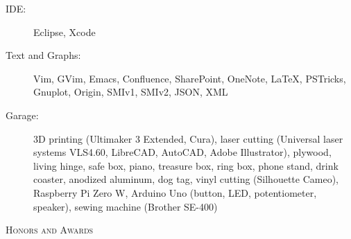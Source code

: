 \documentclass[letterpaper,11pt]{article}
\newcommand{\resheading}[1]{{\noindent\large \colorbox{mygrey}{
\begin{minipage}{1.0\textwidth}{\textsc{#1 \vphantom{p\^{E}}}}\end{minipage}}}}
\begin{document}
\begin{description}
\item[IDE:] Eclipse, Xcode

\item[Text and Graphs:] Vim, GVim, Emacs, Confluence, SharePoint, OneNote, \LaTeX, PSTricks, Gnuplot, Origin, SMIv1, SMIv2, JSON, XML

\item[Garage:] 3D printing (Ultimaker 3 Extended, Cura), laser cutting (Universal laser systems VLS4.60, LibreCAD, AutoCAD, Adobe Illustrator),
plywood, living hinge, safe box, piano, treasure box, ring box, phone stand, drink coaster, anodized aluminum, dog tag,
vinyl cutting (Silhouette Cameo), Raspberry Pi Zero W, Arduino Uno (button, LED, potentiometer, speaker), sewing machine (Brother SE-400)

\end{description}




\resheading{Honors and Awards}%
\end{document}
